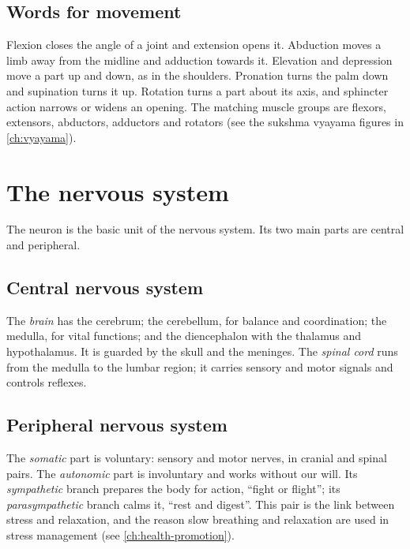 
\subsection*{Words for movement}
Flexion closes the angle of a joint and extension opens it. Abduction moves a limb away from the midline and adduction towards it. Elevation and depression move a part up and down, as in the shoulders. Pronation turns the palm down and supination turns it up. Rotation turns a part about its axis, and sphincter action narrows or widens an opening. The matching muscle groups are flexors, extensors, abductors, adductors and rotators (see the sukshma vyayama figures in \cref{ch:vyayama}).

\section{The nervous system}

The neuron is the basic unit of the nervous system. Its two main parts are central and peripheral.

\subsection*{Central nervous system}
The \emph{brain} has the cerebrum; the cerebellum, for balance and coordination; the medulla, for vital functions; and the diencephalon with the thalamus and hypothalamus. It is guarded by the skull and the meninges. The \emph{spinal cord} runs from the medulla to the lumbar region; it carries sensory and motor signals and controls reflexes.


\subsection*{Peripheral nervous system}
The \emph{somatic} part is voluntary: sensory and motor nerves, in cranial and spinal pairs. The \emph{autonomic} part is involuntary and works without our will. Its \emph{sympathetic} branch prepares the body for action, ``fight or flight''; its \emph{parasympathetic} branch calms it, ``rest and digest''. This pair is the link between stress and relaxation, and the reason slow breathing and relaxation are used in stress management (see \cref{ch:health-promotion}).

